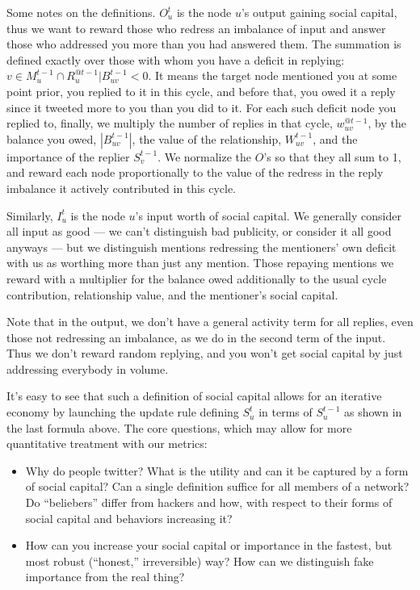 \documentclass[10pt,oneside]{memoir}
\begin{document}
Some notes on the definitions. $O_{u}^{t}$ is the node $u$'s output gaining social capital, thus we want to reward those who redress an imbalance of input and answer those who addressed you more than you had answered them. The summation is defined exactly over those with whom you have a deficit in replying: $v\in M_{u}^{t-1}\cap R_{u}^{@t-1}|B_{uv}^{t-1}<0$. It means the target node mentioned you at some point prior, you replied to it in this cycle, and before that, you owed it a reply since it tweeted more to you than you did to it. For each such deficit node you replied to, finally, we multiply the number of replies in that cycle, $w_{uv}^{@t-1}$, by the balance you owed, $|B_{uv}^{t-1}|$, the value of the relationship, $W_{uv}^{t-1}$, and the importance of the replier $S_{v}^{t-1}$. We normalize the $O$'s so that they all sum to 1, and reward each node proportionally to the value of the redress in the reply imbalance it actively contributed in this cycle.

Similarly, $I_{u}^{t}$ is the node $u$'s input worth of social capital. We generally consider all input as good — we can't distinguish bad publicity, or consider it all good anyways — but we distinguish mentions redressing the mentioners' own deficit with us as worthing more than just any mention. Those repaying mentions we reward with a multiplier for the balance owed additionally to the usual cycle contribution, relationship value, and the mentioner's social capital.

Note that in the output, we don't have a general activity term for all replies, even those not redressing an imbalance, as we do in the second term of the input. Thus we don't reward random replying, and you won't get social capital by just addressing everybody in volume.

It's easy to see that such a definition of social capital allows for an iterative economy by launching the update rule defining $S_{u}^{t}$ in terms of $S_{u}^{t-1}$ as shown in the last formula above.
The core questions, which may allow for more quantitative treatment with our metrics:


\begin{itemize}


\item Why do people twitter? What is the utility and can it be captured by a form of social capital? Can a single definition suffice for all members of a network? Do ``beliebers'' differ from hackers and how, with respect to their forms of social capital and behaviors increasing it?




\item How can you increase your social capital or importance in the fastest, but most robust (``honest,'' irreversible) way? How can we distinguish fake importance from the real thing?



\end{itemize}
\end{document}
